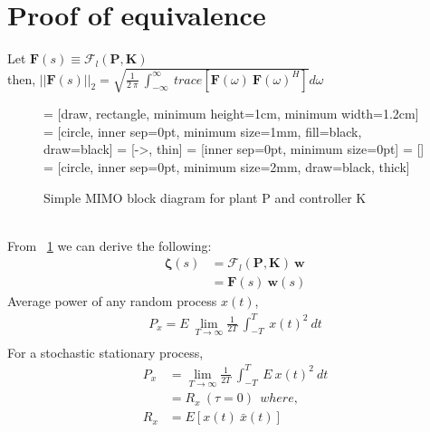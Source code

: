\documentclass{scrreprt}
\begin{document}
\section{Proof of equivalence}
Let $\bm{F}(s) \equiv \mathcal{F}_l(\bm{P},\bm{K})$ \\
then, $||\bm{F}(s)||_2 = \sqrt{\frac{1}{2\:\pi}\: \int_{-\infty}^{\infty}\: trace[\bm{F}(\omega)\:\bm{F}(\omega)^H]}d\omega$
\\
\begin{figure}[htb]
  \centering
       = [draw, rectangle, minimum height=1cm, minimum width=1.2cm]
        = [circle, inner sep=0pt, minimum size=1mm, fill=black, draw=black]
     = [->, thin]
         = [inner sep=0pt, minimum size=0pt]
         = []
           = [circle, inner sep=0pt, minimum size=2mm, draw=black, thick]
	  \caption{Simple MIMO block diagram for plant P and controller K}
    \label{fig:blockDiagram}
\end{figure} \\
From ~\ref{fig:blockDiagram} we can derive the following:
\begin{align*}
\bm{\zeta}(s) &= \mathcal{F}_l(\bm{P},\bm{K})\: \bm{w} \\
	&= \bm{F}(s)\:\bm{w}(s)
\end{align*}
Average power of any random process $x(t)$,
\begin{align*}
P_x = E\:\lim_{T\to\infty} \frac{1}{2T}\:\int_{-T}^T\: x(t)^2\:dt \\
\end{align*}
For a stochastic stationary process,
\begin{align*}
P_x &= \lim_{T\to\infty} \frac{1}{2T}\:\int_{-T}^T\: E\:x(t)^2\:dt \\
	&= R_x\:(\tau=0) \ \ where,\\
R_x &= E[x(t)\:\bar{x}(t)] \\
\end{align*}
\end{document}
